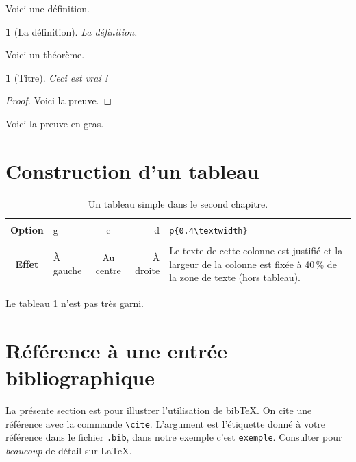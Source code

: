 \documentclass[11pt,twoside,maitrise]{dms}
\newtheorem{deff}[cor]{\definitionname}
\newtheorem{theo}[cor]{\theoremname}
\theoremstyle{definition}
\numberwithin{equation}{section}
\numberwithin{table}{chapter}
\numberwithin{figure}{chapter}
\begin{document}
Voici une définition.
\begin{deff}[La définition]
    La définition.
\end{deff}
Voici un théorème.
\begin{theo}[Titre]
    Ceci est vrai !
\end{theo}
\begin{proof}
    Voici la preuve.
\end{proof}
\begin{demo}
    Voici la preuve en gras.
\end{demo}

\section{Construction d'un tableau}

\begin{table}[htb]
    \centering
    \begin{tabular}{|c||l|c|r|p{}|}
        \hline            &            &            &            &                                                                                                                            \\
        \textbf{Option}    & g            & c            & d            & \verb|p{0.4\textwidth}|                                                                                                    \\[3mm]
        \hline\hline    &            &            &            &                                                                                                                            \\
        \textbf{Effet}    & À gauche    & Au centre    & À droite    & Le texte de cette colonne est justifié et la largeur de la colonne est fixée à 40\,\% de la zone de texte (hors tableau).    \\[3mm]
        \hline
    \end{tabular}
    \caption{Un tableau simple dans le second chapitre.}
    \label{tab:simple2}
\end{table}
Le tableau \ref{tab:simple2} n'est pas très garni.

\section{Référence à une entrée bibliographique}

La présente section est pour illustrer l'utilisation de
bib\TeX. On cite une référence avec la commande \verb|\cite|.
L'argument est l'étiquette donné à votre référence dans
le fichier \texttt{.bib}, dans notre exemple c'est \texttt{exemple}.
Consulter \cite{exemple} pour \textit{beaucoup} de détail sur \LaTeX.
\end{document}
